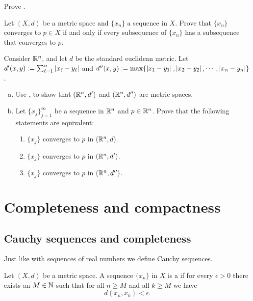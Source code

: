 \begin{exercise}
Prove .
\end{exercise}

\begin{exercise}
Let $(X,d)$ be a metric space and $\{ x_n \}$ a sequence in $X$.
Prove that $\{ x_n \}$ converges to $p \in X$
if and only if
every subsequence of $\{ x_n \}$ has a subsequence that
converges to $p$.
\end{exercise}

\begin{exercise}
Consider ${\mathbb{R}}^n$, and let $d$ be the standard euclidean metric.
Let $d'(x,y) := \sum_{\ell=1}^n \left\lvert {x_\ell-y_\ell} \right\rvert$
and $d''(x,y) := \max \{ \left\lvert {x_1-y_1} \right\rvert,\left\lvert {x_2-y_2} \right\rvert,\cdots,\left\lvert {x_n-y_n} \right\rvert
\}$.
\begin{enumerate}[a)]
\item
Use , to show that
$({\mathbb{R}}^n,d')$ and
$({\mathbb{R}}^n,d'')$ are metric spaces.
\item
Let $\{ x_j \}_{j=1}^\infty$ be a sequence in ${\mathbb{R}}^n$ and $p \in {\mathbb{R}}^n$.
Prove that the following statements are equivalent:
\begin{enumerate}[(1)]
\item
$\{ x_j \}$ converges to $p$ in $({\mathbb{R}}^n,d)$.
\item
$\{ x_j \}$ converges to $p$ in $({\mathbb{R}}^n,d')$.
\item
$\{ x_j \}$ converges to $p$ in $({\mathbb{R}}^n,d'')$.
\end{enumerate}
\end{enumerate}
\end{exercise}


\sectionnewpage
\section{Completeness and compactness}
\label{sec:metcompact}


\subsection{Cauchy sequences and completeness}

Just like with sequences of real numbers we define Cauchy sequences.

\begin{defn}
Let $(X,d)$ be a metric space.
A sequence $\{ x_n \}$ in $X$ is a \emph{} if
for every $\epsilon > 0$ there exists an $M \in {\mathbb{N}}$ such that
for all $n \geq M$ and all $k \geq M$ we have
\begin{equation*}
d(x_n, x_k) < \epsilon .
\end{equation*}
\end{defn}

